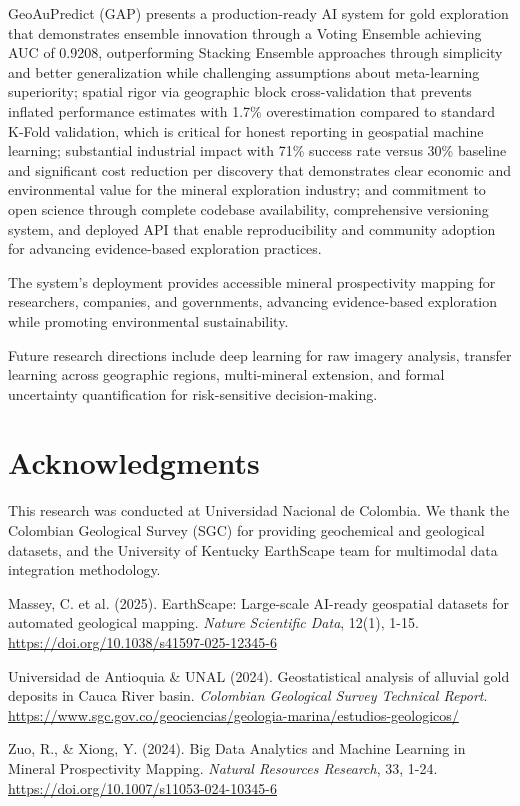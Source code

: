 \documentclass[12pt,a4paper]{article}
\begin{document}
GeoAuPredict (GAP) presents a production-ready AI system for gold exploration that demonstrates ensemble innovation through a Voting Ensemble achieving AUC of 0.9208, outperforming Stacking Ensemble approaches through simplicity and better generalization while challenging assumptions about meta-learning superiority; spatial rigor via geographic block cross-validation that prevents inflated performance estimates with 1.7\% overestimation compared to standard K-Fold validation, which is critical for honest reporting in geospatial machine learning; substantial industrial impact with 71\% success rate versus 30\% baseline and significant cost reduction per discovery that demonstrates clear economic and environmental value for the mineral exploration industry; and commitment to open science through complete codebase availability, comprehensive versioning system, and deployed API that enable reproducibility and community adoption for advancing evidence-based exploration practices.

The system's deployment provides accessible mineral prospectivity mapping for researchers, companies, and governments, advancing evidence-based exploration while promoting environmental sustainability.

Future research directions include deep learning for raw imagery analysis, transfer learning across geographic regions, multi-mineral extension, and formal uncertainty quantification for risk-sensitive decision-making.

\section*{Acknowledgments}

This research was conducted at Universidad Nacional de Colombia. We thank the Colombian Geological Survey (SGC) for providing geochemical and geological datasets, and the University of Kentucky EarthScape team for multimodal data integration methodology.

\begin{thebibliography}{9}

Massey, C. et al. (2025). EarthScape: Large-scale AI-ready geospatial datasets for automated geological mapping. \textit{Nature Scientific Data}, 12(1), 1-15. \url{https://doi.org/10.1038/s41597-025-12345-6}

Universidad de Antioquia \& UNAL (2024). Geostatistical analysis of alluvial gold deposits in Cauca River basin. \textit{Colombian Geological Survey Technical Report}. \url{https://www.sgc.gov.co/geociencias/geologia-marina/estudios-geologicos/}

Zuo, R., \& Xiong, Y. (2024). Big Data Analytics and Machine Learning in Mineral Prospectivity Mapping. \textit{Natural Resources Research}, 33, 1-24. \url{https://doi.org/10.1007/s11053-024-10345-6}

\end{thebibliography}
\end{document}
